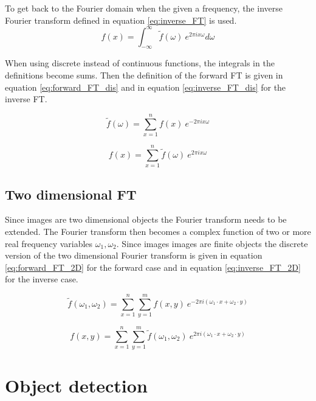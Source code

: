 To get back to the Fourier domain when the given a frequency, the inverse Fourier transform defined in equation \ref{eq:inverse_FT} is used.  \\

\begin{equation}
	f(x) = \int_{-\infty}^{\infty} \tilde{f}(\omega)\ e^{2 \pi i x \omega}d\omega
	\label{eq:inverse_FT}
\end{equation}

When using discrete instead of continuous functions, the integrals in the definitions become sums. Then the definition of the forward FT is given in equation \ref{eq:forward_FT_dis} and in equation \ref{eq:inverse_FT_dis} for the inverse FT. 

\begin{equation}
\tilde{f}(\omega) = \sum_{x=1}^{n} f(x)\ e^{-2\pi i x \omega}
\label{eq:forward_FT_dis}
\end{equation} 

\begin{equation}
f(x) = \sum_{x=1}^{n} \tilde{f}(\omega)\ e^{2 \pi i x \omega}
\label{eq:inverse_FT_dis}
\end{equation}

\subsection{Two dimensional FT}

Since images are two dimensional objects the Fourier transform needs to be extended. The Fourier transform then becomes a complex function of two or more real frequency variables $\omega_1, \omega_2$. Since images images are finite objects the discrete version of the two dimensional Fourier transform is given in equation \ref{eq:forward_FT_2D} for the forward case and in equation \ref{eq:inverse_FT_2D} for the inverse case.

\begin{equation}
	\tilde{f}(\omega_1, \omega_2) = \sum_{x=1}^{n} \sum_{y=1}^{m} f(x,y)\ e^{-2\pi i (\omega_1 \cdot x + \omega_2 \cdot y)}
\label{eq:forward_FT_2D}
\end{equation}

\begin{equation}
f(x, y) = \sum_{x=1}^{n} \sum_{y=1}^{m} \tilde{f}(\omega_1, \omega_2)\ e^{2\pi i (\omega_1 \cdot x + \omega_2 \cdot y)}
\label{eq:inverse_FT_2D}
\end{equation}

\section{Object detection}

